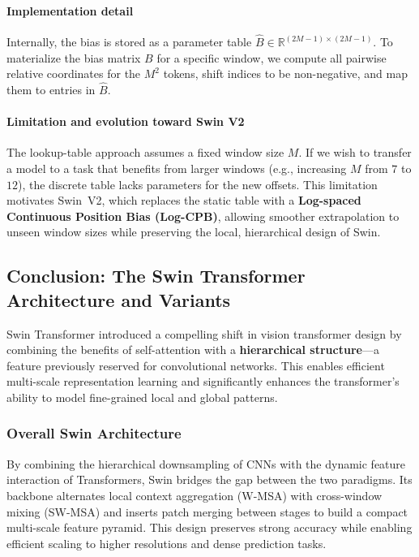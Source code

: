 \paragraph{Implementation detail}
\noindent
Internally, the bias is stored as a parameter table
\(\hat{B} \in \mathbb{R}^{(2M-1)\times(2M-1)}\).
To materialize the bias matrix \(B\) for a specific window,
we compute all pairwise relative coordinates for the \(M^2\) tokens,
shift indices to be non-negative, and map them to entries in \(\hat{B}\).

\paragraph{Limitation and evolution toward Swin V2}
\noindent
The lookup-table approach assumes a fixed window size \(M\).
If we wish to transfer a model to a task that benefits from larger windows
(e.g., increasing \(M\) from \(7\) to \(12\)),
the discrete table lacks parameters for the new offsets.
This limitation motivates Swin~V2, which replaces the static table with a
\textbf{Log-spaced Continuous Position Bias (Log-CPB)},
allowing smoother extrapolation to unseen window sizes while preserving the
local, hierarchical design of Swin.

\subsection{Conclusion: The Swin Transformer Architecture and Variants}
\label{subsec:chapter18_swin_conclusion}

\noindent
Swin Transformer introduced a compelling shift in vision transformer design by combining the benefits of self-attention with a \textbf{hierarchical structure}—a feature previously reserved for convolutional networks. This enables efficient multi-scale representation learning and significantly enhances the transformer's ability to model fine-grained local and global patterns.

\subsubsection*{Overall Swin Architecture}

\noindent
By combining the hierarchical downsampling of CNNs with the dynamic feature interaction of Transformers, Swin bridges the gap between the two paradigms.
Its backbone alternates local context aggregation (W-MSA) with cross-window mixing (SW-MSA) and inserts patch merging between stages to build a compact multi-scale feature pyramid.
This design preserves strong accuracy while enabling efficient scaling to higher resolutions and dense prediction tasks.


